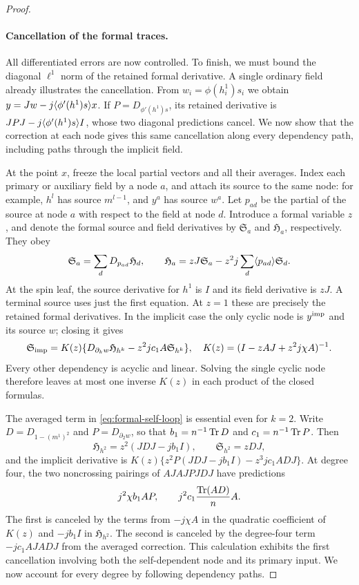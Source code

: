 \begin{proof}
\paragraph{Cancellation of the formal traces.}
All differentiated errors are now controlled. To finish, we must bound
the diagonal $\ell^1$ norm of the retained formal derivative. A single
ordinary field already illustrates the cancellation. From
$w_i=\phi(h_i^1)s_i$ we obtain
$y=Jw-j\langle \phi'(h^1)s\rangle x$. If $P=D_{\phi'(h^1)s}$, its retained
derivative is $JPJ-j\langle \phi'(h^1)s\rangle I$, whose two diagonal predictions
cancel. We now show that the correction at each node gives this same
cancellation along every dependency path, including paths through the
implicit field.

At the point $x$, freeze the local partial vectors and all their averages. Index
each primary or auxiliary field by a node $a$, and attach its source to
the same node: for example, $h^l$ has source $m^{l-1}$, and $y^a$ has
source $w^a$. Let $p_{ad}$ be the partial of the source at node $a$
with respect to the field at node $d$. Introduce a formal variable $z$,
and denote the formal source and field derivatives by
$\mathfrak S_a$ and $\mathfrak H_a$, respectively. They obey
\begin{equation}
 \mathfrak S_a=\sum_dD_{p_{ad}}\mathfrak H_d,
 \qquad
 \mathfrak H_a=zJ\mathfrak S_a
             -z^2j\sum_d\langle p_{ad}\rangle\mathfrak S_d.
 \label{eq:formal-graph}
\end{equation}
At the spin leaf, the source derivative for $h^1$ is $I$ and its field
derivative is $zJ$.  A terminal source uses just the first equation.
At $z=1$ these are precisely the retained formal derivatives.  In the
implicit case the only cyclic node is $y^{\rm imp}$ and its source $w$;
closing it gives
\begin{equation}
 \mathfrak S_{\rm imp}
 =K(z)\{D_{\partial_k w}\mathfrak H_{h^k}
                 -z^2jc_1A\mathfrak S_{h^k}\},
 \quad K(z)=(I-zAJ+z^2j\chi A)^{-1}.
 \label{eq:formal-self-loop}
\end{equation}
Every other dependency is acyclic and linear. Solving the single cyclic
node therefore leaves at most one inverse $K(z)$ in each product of the
closed formulas.

The averaged term in \eqref{eq:formal-self-loop} is essential even for
$k=2$. Write $D=D_{1-(m^1)^2}$ and $P=D_{\partial_2w}$, so that
$b_1=n^{-1}\operatorname{Tr} D$ and $c_1=n^{-1}\operatorname{Tr} P$. Then
\[
 \mathfrak H_{h^2}=z^2(JDJ-jb_1I),\qquad
 \mathfrak S_{h^2}=zDJ,
\]
and the implicit derivative is
$K(z)\{z^2P(JDJ-jb_1I)-z^3jc_1ADJ\}$.
At degree four, the two noncrossing pairings of $AJAJPJDJ$ have
predictions
\[
 j^2\chi b_1 AP,
 \qquad j^2c_1\frac{\operatorname{Tr}(AD)}n A.
\]
The first is canceled by the terms from $-j\chi A$ in the
quadratic coefficient of $K(z)$ and $-jb_1I$ in
$\mathfrak H_{h^2}$. The second is canceled by the degree-four
term $-jc_1AJADJ$ from the averaged correction. This calculation exhibits
the first cancellation involving both the
self-dependent node and its primary input. We now account for every
degree by following dependency paths.


\end{proof}
